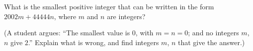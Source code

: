 What is the smallest positive integer that can be written in the form $2002m+44444n$, where $m$ and $n$ are integers?

(A student argues: ``The smallest value is $0$, with $m=n=0$; and no integers $m$, $n$ give $2$.'' Explain what is wrong, and find integers $m$, $n$ that give the answer.)
